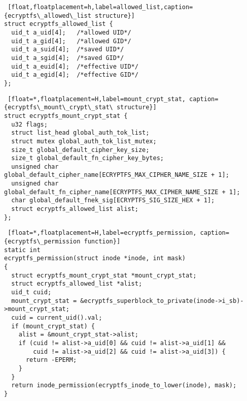 \lstset{frame=l,
  language=C,
  showspaces=false,
  showstringspaces=false,
  showtabs=false,
  tabsize=2,
  keepspaces=true,
  captionpos=b,
  basicstyle=\ttfamily
}
\begin{consistifyoff}
\begin{lstlisting} [float,floatplacement=h,label=allowed_list,caption={ecryptfs\_allowed\_list structure}]
struct ecryptfs_allowed_list {
  uid_t a_uid[4];   /*allowed UID*/
  uid_t a_gid[4];   /*allowed GID*/
  uid_t a_suid[4];  /*saved UID*/
  uid_t a_sgid[4];  /*saved GID*/
  uid_t a_euid[4];  /*effective UID*/
  uid_t a_egid[4];  /*effective GID*/
};
\end{lstlisting}

\begin{lstlisting} [float=*,floatplacement=H,label=mount_crypt_stat, caption={ecryptfs\_mount\_crypt\_stat\ structure}]
struct ecryptfs_mount_crypt_stat {
  u32 flags;
  struct list_head global_auth_tok_list;
  struct mutex global_auth_tok_list_mutex;
  size_t global_default_cipher_key_size;
  size_t global_default_fn_cipher_key_bytes;
  unsigned char global_default_cipher_name[ECRYPTFS_MAX_CIPHER_NAME_SIZE + 1];
  unsigned char global_default_fn_cipher_name[ECRYPTFS_MAX_CIPHER_NAME_SIZE + 1];
  char global_default_fnek_sig[ECRYPTFS_SIG_SIZE_HEX + 1]; 
  struct ecryptfs_allowed_list alist;
};
\end{lstlisting}

\begin{lstlisting} [float=*,floatplacement=H,label=ecryptfs_permission, caption={ecryptfs\_permission function}]
static int
ecryptfs_permission(struct inode *inode, int mask)
{
  struct ecryptfs_mount_crypt_stat *mount_crypt_stat;
  struct ecryptfs_allowed_list *alist;
  uid_t cuid;
  mount_crypt_stat = &ecryptfs_superblock_to_private(inode->i_sb)->mount_crypt_stat;
  cuid = current_uid().val;
  if (mount_crypt_stat) {
    alist = &mount_crypt_stat->alist;
    if (cuid != alist->a_uid[0] && cuid != alist->a_uid[1] &&
        cuid != alist->a_uid[2] && cuid != alist->a_uid[3]) {
      return -EPERM;
    }    
  }
  return inode_permission(ecryptfs_inode_to_lower(inode), mask);
}
\end{lstlisting}
\end{consistifyoff}
